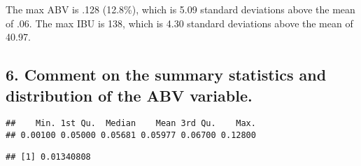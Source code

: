 \documentclass[
]{article}
\newenvironment{Shaded}{\begin{snugshade}}{\end{snugshade}}
\newcommand{\CommentTok}[1]{\textcolor[rgb]{0.56,0.35,0.01}{\textit{#1}}}
\newcommand{\FunctionTok}[1]{\textcolor[rgb]{0.00,0.00,0.00}{#1}}
\newcommand{\NormalTok}[1]{#1}
\newcommand{\OtherTok}[1]{\textcolor[rgb]{0.56,0.35,0.01}{#1}}
\newcommand{\SpecialCharTok}[1]{\textcolor[rgb]{0.00,0.00,0.00}{#1}}
\begin{document}
\begin{Shaded}
\end{Shaded}

The max ABV is .128 (12.8\%), which is 5.09 standard deviations above
the mean of .06. The max IBU is 138, which is 4.30 standard deviations
above the mean of 40.97.

\hypertarget{comment-on-the-summary-statistics-and-distribution-of-the-abv-variable.}{%
\subsection{6. Comment on the summary statistics and distribution of the
ABV
variable.}\label{comment-on-the-summary-statistics-and-distribution-of-the-abv-variable.}}

\begin{Shaded}
\end{Shaded}

\begin{verbatim}
##    Min. 1st Qu.  Median    Mean 3rd Qu.    Max. 
## 0.00100 0.05000 0.05681 0.05977 0.06700 0.12800
\end{verbatim}

\begin{Shaded}
\end{Shaded}

\begin{verbatim}
## [1] 0.01340808
\end{verbatim}
\end{document}
